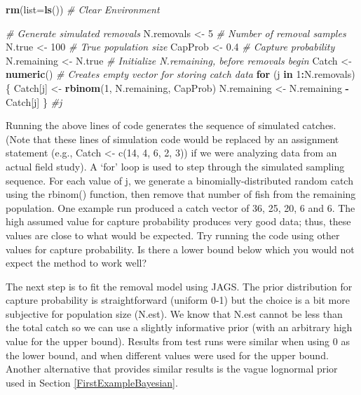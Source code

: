 \documentclass[
]{krantz}
\makeatletter
\newenvironment{Shaded}{\begin{snugshade}}{\end{snugshade}}
\newcommand{\AttributeTok}[1]{\textcolor[rgb]{0.27,0.27,0.27}{#1}}
\newcommand{\CommentTok}[1]{\textcolor[rgb]{0.37,0.37,0.37}{\textit{#1}}}
\newcommand{\ControlFlowTok}[1]{\textcolor[rgb]{0.27,0.27,0.27}{\textbf{#1}}}
\newcommand{\DecValTok}[1]{\textcolor[rgb]{0.06,0.06,0.06}{#1}}
\newcommand{\FloatTok}[1]{\textcolor[rgb]{0.06,0.06,0.06}{#1}}
\newcommand{\FunctionTok}[1]{\textcolor[rgb]{0.27,0.27,0.27}{\textbf{#1}}}
\newcommand{\NormalTok}[1]{#1}
\newcommand{\OtherTok}[1]{\textcolor[rgb]{0.37,0.37,0.37}{#1}}
\newcommand{\SpecialCharTok}[1]{\textcolor[rgb]{0.43,0.43,0.43}{\textbf{#1}}}
\newenvironment{kframe}{%
\medskip{}
\setlength{\fboxsep}{.8em}
 \def\at@end@of@kframe{}%
 \ifinner\ifhmode%
  \def\at@end@of@kframe{\end{minipage}}%
  \begin{minipage}{\columnwidth}%
 \fi\fi%
 \def\FrameCommand##1{\hskip\@totalleftmargin \hskip-\fboxsep
 \colorbox{shadecolor}{##1}\hskip-\fboxsep
     \hskip-\linewidth \hskip-\@totalleftmargin \hskip\columnwidth}%
 \MakeFramed {\advance\hsize-\width
   \@totalleftmargin\z@ \linewidth\hsize
   \@setminipage}}%
 {\par\unskip\endMakeFramed%
 \at@end@of@kframe}
\renewenvironment{Shaded}{\begin{kframe}}{\end{kframe}}
\makeatother
\begin{document}
\begin{Shaded}
\begin{Highlighting}[]
\FunctionTok{rm}\NormalTok{(}\AttributeTok{list=}\FunctionTok{ls}\NormalTok{()) }\CommentTok{\# Clear Environment}

\CommentTok{\# Generate simulated removals}
\NormalTok{N.removals }\OtherTok{\textless{}{-}} \DecValTok{5} \CommentTok{\# Number of removal samples}
\NormalTok{N.true }\OtherTok{\textless{}{-}} \DecValTok{100}    \CommentTok{\# True population size}
\NormalTok{CapProb }\OtherTok{\textless{}{-}} \FloatTok{0.4}   \CommentTok{\# Capture probability}
\NormalTok{N.remaining }\OtherTok{\textless{}{-}}\NormalTok{ N.true }\CommentTok{\# Initialize N.remaining, before removals begin}
\NormalTok{Catch }\OtherTok{\textless{}{-}} \FunctionTok{numeric}\NormalTok{() }\CommentTok{\# Creates empty vector for storing catch data}
\ControlFlowTok{for}\NormalTok{ (j }\ControlFlowTok{in} \DecValTok{1}\SpecialCharTok{:}\NormalTok{N.removals)\{}
\NormalTok{  Catch[j] }\OtherTok{\textless{}{-}} \FunctionTok{rbinom}\NormalTok{(}\DecValTok{1}\NormalTok{, N.remaining, CapProb)}
\NormalTok{  N.remaining }\OtherTok{\textless{}{-}}\NormalTok{ N.remaining }\SpecialCharTok{{-}}\NormalTok{ Catch[j]}
\NormalTok{  \} }\CommentTok{\#j}
\end{Highlighting}
\end{Shaded}

Running the above lines of code generates the sequence of simulated catches. (Note that these lines of simulation code would be replaced by an assignment statement (e.g., Catch \textless- c(14, 4, 6, 2, 3)) if we were analyzing data from an actual field study). A `for' loop is used to step through the simulated sampling sequence. For each value of j, we generate a binomially-distributed random catch using the rbinom() function, then remove that number of fish from the remaining population. One example run produced a catch vector of 36, 25, 20, 6 and 6. The high assumed value for capture probability produces very good data; thus, these values are close to what would be expected. Try running the code using other values for capture probability. Is there a lower bound below which you would not expect the method to work well?

The next step is to fit the removal model using JAGS. The prior distribution for capture probability is straightforward (uniform 0-1) but the choice is a bit more subjective for population size (N.est). We know that N.est cannot be less than the total catch so we can use a slightly informative prior (with an arbitrary high value for the upper bound). Results from test runs were similar when using 0 as the lower bound, and when different values were used for the upper bound. Another alternative that provides similar results is the vague lognormal prior used in Section \ref{FirstExampleBayesian}.
\end{document}
